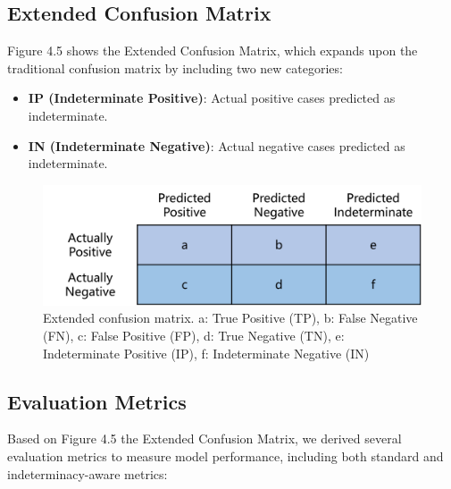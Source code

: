 \subsection{Extended Confusion Matrix}

Figure 4.5 shows the Extended Confusion Matrix, which expands upon the traditional confusion matrix by including two new categories:

\begin{itemize}
    \item \textbf{IP (Indeterminate Positive)}: Actual positive cases predicted as indeterminate.
    \item \textbf{IN (Indeterminate Negative)}: Actual negative cases predicted as indeterminate.
\end{itemize}

\begin{figure}[H]
    \centering
    \includegraphics[width=0.6\linewidth]{figures/Extended confusion matrix.png}
    \caption{Extended confusion matrix. a: True Positive (TP), b: False Negative (FN), c: False Positive (FP), d: True Negative (TN), e: Indeterminate Positive (IP), f: Indeterminate Negative (IN)}
    \label{fig:enter-label}
\end{figure}

\subsection{Evaluation Metrics}

Based on Figure 4.5 the Extended Confusion Matrix, we derived several evaluation metrics to measure model performance, including both standard and indeterminacy-aware metrics:

